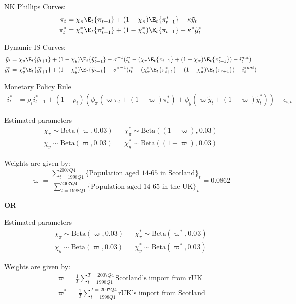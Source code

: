 NK Phillips Curves:
\begin{align*}
    \pi_t &= \chi_{\pi}\E_t\{ \pi_{t+1} \} + (1-\chi_{\pi})\E_t\{ \pi^*_{t+1} \} + \kappa \tilde{y}_t \\
    \pi^*_t &= \chi^*_{\pi}\E_t\{ \pi^*_{t+1} \} + (1-\chi^*_{\pi})\E_t\{ \pi_{t+1} \} + \kappa^* \tilde{y}^*_t
\end{align*}

Dynamic IS Curves:
\begin{align*}
    \tilde{y}_t &= \chi_{y}\E_t \{ \tilde{y}_{t+1} \} + (1-\chi_{y}) \E_t \{ \tilde{y}^*_{t+1} \} - {\sigma}^{-1}(i^*_t-(\chi_{\pi}\E_t\{ \pi_{t+1} \} + (1-\chi_{\pi})\E_t\{ \pi^*_{t+1} \}) - i_t^{nat}) \\
    \tilde{y}^*_t &= \chi^*_{y}\E_t \{ \tilde{y}^*_{t+1} \} + (1-\chi^*_{y}) \E_t \{ \tilde{y}_{t+1} \} - {\sigma^*}^{-1}(i^*_t-(\chi^*_{\pi}\E_t\{ \pi^*_{t+1} \} + (1-\chi^*_{\pi})\E_t\{ \pi_{t+1} \}) - i_t^{*nat})
\end{align*}

Monetary Policy Rule
\begin{align*}
    i^*_t &= \rho_i i^*_{t-1} + (1-\rho_i)(\phi_{\pi}(\varpi\pi_t + (1-\varpi)\pi^*_t) + \phi_{y}(\varpi \tilde{y}_t + (1-\varpi)\tilde{y}^*_t)) + \epsilon_{i,t}
\end{align*}

Estimated parameters
\begin{align*}
    \chi_{\pi} \sim \text{Beta}(\varpi, 0.03) && \chi^*_{\pi} \sim \text{Beta}((1-\varpi), 0.03)\\
    \chi_{y} \sim \text{Beta}(\varpi, 0.03) && \chi^*_{y} \sim \text{Beta}((1-\varpi), 0.03)
\end{align*}

Weights are given by:
\begin{equation*}
    \varpi = \frac{\sum_{t=1998Q1}^{2007Q4} \{\text{Population aged 14-65 in Scotland}\}_t}{\sum_{t=1998Q1}^{2007Q4} \{\text{Population aged 14-65 in the UK}\}_t} = 0.0862
\end{equation*}

\textbf{OR}

Estimated parameters
\begin{align*}
    \chi_{\pi} \sim \text{Beta}(\varpi, 0.03) && \chi^*_{\pi} \sim \text{Beta}(\varpi^*, 0.03)\\
    \chi_{y} \sim \text{Beta}(\varpi, 0.03) && \chi^*_{y} \sim \text{Beta}(\varpi^*, 0.03)
\end{align*}

Weights are given by:
\begin{align*}
    \varpi = \frac{1}{T}\sum\limits_{t=1998Q1}^{T=2007Q4}\text{Scotland's import from rUK} \\
    \varpi^* = \frac{1}{T}\sum\limits_{t=1998Q1}^{T=2007Q4}\text{rUK's import from Scotland}
\end{align*}
